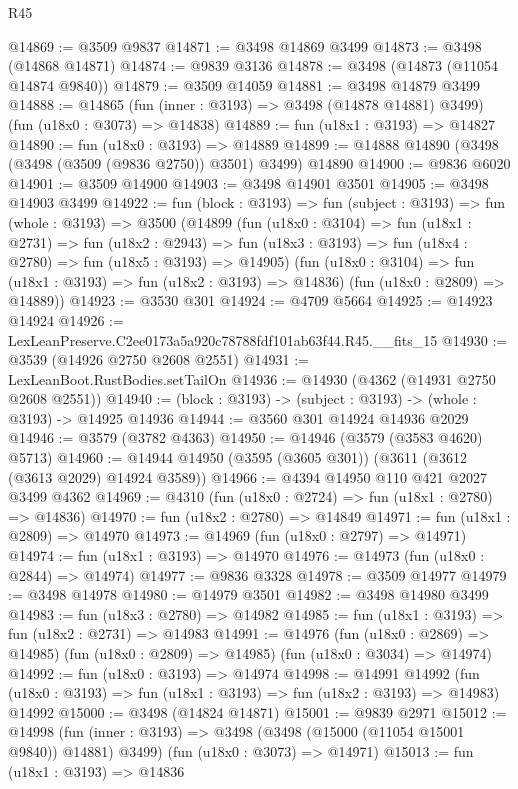 \begin{lexlean}{R45}
\begin{coremodule}
@14869 := @3509 @9837
@14871 := @3498 @14869 @3499
@14873 := @3498 (@14868 @14871)
@14874 := @9839 @3136
@14878 := @3498 (@14873 (@11054 @14874 @9840))
@14879 := @3509 @14059
@14881 := @3498 @14879 @3499
@14888 := @14865
    (fun (inner : @3193) => @3498 (@14878 @14881) @3499)
    (fun (u18x0 : @3073) => @14838)
@14889 := fun (u18x1 : @3193) => @14827
@14890 := fun (u18x0 : @3193) => @14889
@14899 := @14888 @14890 (@3498 (@3498 (@3509 (@9836 @2750)) @3501) @3499) @14890
@14900 := @9836 @6020
@14901 := @3509 @14900
@14903 := @3498 @14901 @3501
@14905 := @3498 @14903 @3499
@14922 := fun (block : @3193) =>
  fun (subject : @3193) =>
  fun (whole : @3193) =>
  @3500
    (@14899
      (fun (u18x0 : @3104) =>
      fun (u18x1 : @2731) =>
      fun (u18x2 : @2943) =>
      fun (u18x3 : @3193) => fun (u18x4 : @2780) => fun (u18x5 : @3193) => @14905)
      (fun (u18x0 : @3104) => fun (u18x1 : @3193) => fun (u18x2 : @3193) => @14836)
      (fun (u18x0 : @2809) => @14889))
@14923 := @3530 @301
@14924 := @4709 @5664
@14925 := @14923 @14924
@14926 := LexLeanPreserve.C2ee0173a5a920c78788fdf101ab63f44.R45.__fits_15
@14930 := @3539 (@14926 @2750 @2608 @2551)
@14931 := LexLeanBoot.RustBodies.setTailOn
@14936 := @14930 (@4362 (@14931 @2750 @2608 @2551))
@14940 := (block : @3193) -> (subject : @3193) -> (whole : @3193) -> @14925 @14936
@14944 := @3560 @301 @14924 @14936 @2029
@14946 := @3579 (@3782 @4363)
@14950 := @14946 (@3579 (@3583 @4620) @5713)
@14960 := @14944 @14950 (@3595 (@3605 @301)) (@3611 (@3612 (@3613 @2029) @14924 @3589))
@14966 := @4394 @14950 @110 @421 @2027 @3499 @4362
@14969 := @4310 (fun (u18x0 : @2724) => fun (u18x1 : @2780) => @14836)
@14970 := fun (u18x2 : @2780) => @14849
@14971 := fun (u18x1 : @2809) => @14970
@14973 := @14969 (fun (u18x0 : @2797) => @14971)
@14974 := fun (u18x1 : @3193) => @14970
@14976 := @14973 (fun (u18x0 : @2844) => @14974)
@14977 := @9836 @3328
@14978 := @3509 @14977
@14979 := @3498 @14978
@14980 := @14979 @3501
@14982 := @3498 @14980 @3499
@14983 := fun (u18x3 : @2780) => @14982
@14985 := fun (u18x1 : @3193) => fun (u18x2 : @2731) => @14983
@14991 := @14976
    (fun (u18x0 : @2869) => @14985)
    (fun (u18x0 : @2809) => @14985)
    (fun (u18x0 : @3034) => @14974)
@14992 := fun (u18x0 : @3193) => @14974
@14998 := @14991
    @14992
    (fun (u18x0 : @3193) => fun (u18x1 : @3193) => fun (u18x2 : @3193) => @14983)
    @14992
@15000 := @3498 (@14824 @14871)
@15001 := @9839 @2971
@15012 := @14998
    (fun (inner : @3193) => @3498 (@3498 (@15000 (@11054 @15001 @9840)) @14881) @3499)
    (fun (u18x0 : @3073) => @14971)
@15013 := fun (u18x1 : @3193) => @14836

\end{coremodule}
\end{lexlean}
